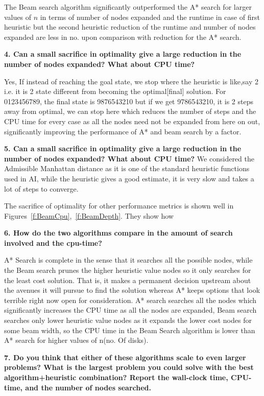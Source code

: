 \documentclass[12pt]{article}
\begin{document}
The Beam search algorithm significantly outperformed the A* search for larger values of $n$ in terms of number of nodes expanded and the runtime in case of first heuristic but the second heuristic reduction of the runtime and number of nodes expanded are less in no. upon comparison with reduction for the A* search.

\textbf{4. Can a small sacrifice in optimality give a large reduction in the number of nodes expanded? What about CPU time?}

Yes, If instead of reaching the goal state, we stop where the heuristic is like,say 2 i.e. it is 2 state different from becoming the optimal[final] solution.
For 0123456789, the final state is 9876543210 but if we get 9786543210, it is 2 steps away from optimal, we can stop here which reduces the number of steps and the CPU time for every case as all the nodes need not be expanded from here on out, significantly improving the performance of A* and beam search by a factor.

\textbf{5. Can a small sacrifice in optimality give a large reduction in the number of nodes expanded? What about CPU time?}
We considered the Admissible Manhattan distance as it is one of the standard heuristic functions used in AI, while the heuristic gives a good estimate, it is very slow and takes a lot of steps to converge. 

The sacrifice of optimality for other performance metrics is shown well in Figures~\ref{f:BeamCpu},~\ref{f:BeamDepth}. 
They show how 

\textbf{6. How do the two algorithms compare in the amount of search involved and the cpu-time?}

A* Search is complete in the sense that it searches all the possible nodes, while the Beam search prunes the higher heuristic value nodes so it only searches for the least cost solution. 
That is, it makes a permanent decision upstream about the avenues it will pursue to find the solution whereas A* keeps options that look terrible right now open for consideration.
A* search searches all the nodes which significantly increases the CPU time as all the nodes are expanded, Beam search searches only lower heuristic value nodes as it expands the lower cost nodes for some beam width, so the CPU time in the Beam Search algorithm is lower than A* search for higher values of n(no. Of disks).

\textbf{7. Do you think that either of these algorithms scale to even larger problems? What is the largest problem you could solve with the best algorithm+heuristic combination? Report the wall-clock time, CPU-time, and the number of nodes searched.}
\end{document}
